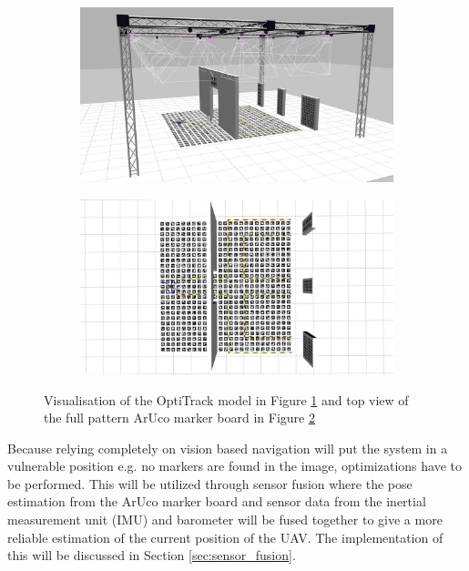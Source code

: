 \documentclass[../Head/report.tex]{subfiles}
\begin{document}
\begin{figure}[H]
    \centering
    \begin{subfigure}[t]{.48\textwidth}
        \centering
        \includegraphics[width=\textwidth]{../Figures//3d-modeling/gazebo_full_pattern_view.jpg}
        \caption{}
        \label{fig:optitrack_full_pattern_aruco}
    \end{subfigure}
    \hfill
    \begin{subfigure}[t]{.48\textwidth}
        \centering
        \includegraphics[width=\textwidth]{../Figures/3d-modeling/gazebo_full_pattern.jpg}
        \caption{}
        \label{fig:full_pattern_aruco}
    \end{subfigure}
    \caption{Visualisation of the OptiTrack model in Figure \ref{fig:optitrack_full_pattern_aruco} and top view of the full pattern ArUco marker board in Figure \ref{fig:full_pattern_aruco}}
    \label{fig:full_pattern_aruco_fig}
\end{figure}

Because relying completely on vision based navigation will put the system in a vulnerable position e.g. no markers are found in the image, optimizations have to be performed. This will be utilized through sensor fusion where the pose estimation from the ArUco marker board and sensor data from the inertial measurement unit (IMU) and barometer will be fused together to give a more reliable estimation of the current position of the UAV. The implementation of this will be discussed in Section \ref{sec:sensor_fusion}. 
\end{document}
